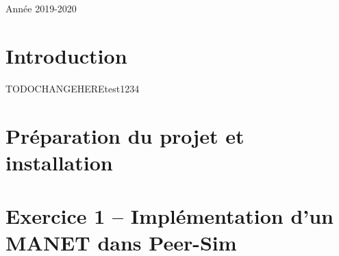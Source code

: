 \documentclass[11pt,a4paper,sans]{report}
\begin{document}
\begin{titlepage}
	{\large Année 2019-2020}\\[2cm] %





\end{titlepage}

\newpage
\tableofcontents
\vspace*{3cm}
\begingroup\let\clearpage\relax

	\newpage
	\chapter{Introduction}

	\begin{comment}
		TODO intro du projet, nos remarques. + Explication du fichier de config accompagnées d’un fichier texte "Readme"
		indiquant comment compiler le projet et lancer les différentes simulations (votre projet doit pouvoir se compiler/lancer en dehors d’Eclipse) Votre rapport, au format pdf, concis, dans lequel vous devez répondre aux questions posées dans le sujet.
	\end{comment}

	TODOCHANGEHEREtest1234\cite{greenwade93}

	\newpage
	\chapter{Préparation du projet et installation}
	\newpage
	\chapter{Exercice 1 – Implémentation d’un MANET dans Peer-Sim}
\end{document}
